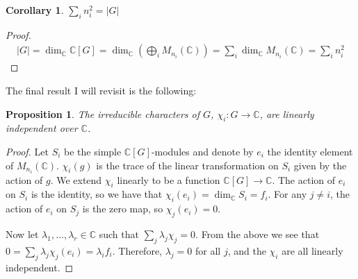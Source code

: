 \documentclass[10pt,a4paper]{article}
\newtheorem{proposition}{Proposition}
\newtheorem{corollary}{Corollary}
\begin{document}
\begin{corollary}
$\sum_i n_i^2 = |G|$
\end{corollary}
\begin{proof}
\begin{align*}
	|G| = \dim_{\mathbb{C}} \mathbb{C}[G] = \dim_{\mathbb{C}} \left(\bigoplus_i M_{n_i}(\mathbb{C})\right) = \sum_i \dim_{\mathbb{C}} M_{n_i}(\mathbb{C}) = \sum_i n_i^2
\end{align*}
\end{proof}

The final result I will revisit is the following:

\begin{proposition}
The irreducible characters of $G$, $\chi_i : G \to \mathbb{C}$, are linearly independent over $\mathbb{C}$.
\end{proposition}

\begin{proof}
Let $S_i$ be the simple $\mathbb{C}[G]$-modules and denote by $e_i$ the identity element of $M_{n_i}(\mathbb{C})$. $\chi_i(g)$ is the trace of the linear transformation on $S_i$ given by the action of $g$. We extend $\chi_i$ linearly to be a function $\mathbb{C}[G] \to \mathbb{C}$. The action of $e_i$ on $S_i$ is the identity, so we have that $\chi_i(e_i) = \dim_{\mathbb{C}} S_i = f_i$. For any $j \neq i$, the action of $e_i$ on $S_j$ is the zero map, so $\chi_j(e_i) = 0$.

Now let $\lambda_1, \dots, \lambda_r \in \mathbb{C}$ such that $\sum_j \lambda_j \chi_j = 0$. From the above we see that $0 = \sum_j \lambda_j \chi_j(e_i) = \lambda_i f_i$. Therefore, $\lambda_j = 0$ for all $j$, and the $\chi_i$ are all linearly independent.
\end{proof}
\end{document}
